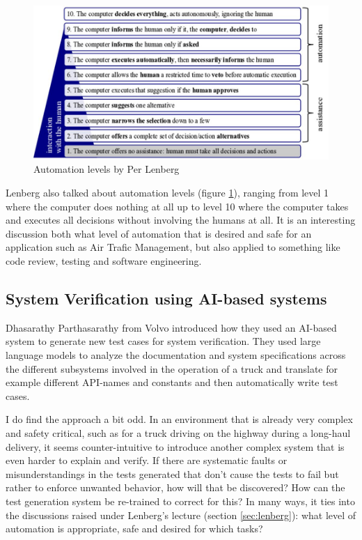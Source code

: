 \documentclass[a4paper,twocolumn]{article}
\begin{document}
\begin{figure}[h]
    \centering
    \includegraphics[width=0.9\columnwidth]{automation_levels.png}
    \caption{Automation levels by Per Lenberg}
    \label{fig:alevels}
\end{figure}

Lenberg also talked about automation levels (figure \ref{fig:alevels}), ranging from
level 1 where the computer does nothing at all up to level 10 where the computer
takes and executes all decisions without involving the humans at all. It is an
interesting discussion both what level of automation that is desired and safe
for an application such as Air Trafic Management, but also applied to something
like code review, testing and software engineering.

\subsection{System Verification using AI-based systems}

Dhasarathy Parthasarathy from Volvo introduced how they used an AI-based system
to generate new test cases for system verification. They used large language
models to analyze the documentation and system specifications across the
different subsystems involved in the operation of a truck and translate for
example different API-names and constants and then automatically write test
cases.

I do find the approach a bit odd. In an environment that is already very complex
and safety critical, such as for a truck driving on the highway during a
long-haul delivery, it seems counter-intuitive to introduce another complex
system that is even harder to explain and verify. If there are systematic faults
or misunderstandings in the tests generated that don't cause the tests to fail
but rather to enforce unwanted behavior, how will that be discovered? How can
the test generation system be re-trained to correct for this? In many ways, it
ties into the discussions raised under Lenberg's lecture
(section \ref{sec:lenberg}): what level of automation is appropriate, safe and
desired for which tasks?
\end{document}
